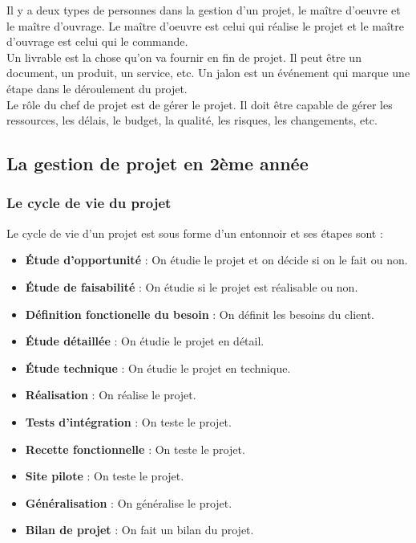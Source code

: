 \documentclass[12pt, a4paper]{article}
\begin{document}
Il y a deux types de personnes dans la gestion d'un projet, le maître d'oeuvre et
le maître d'ouvrage. Le maître d'oeuvre est celui qui réalise le projet et le maître 
d'ouvrage est celui qui le commande.\\

Un livrable est la chose qu'on va fournir en fin de projet. Il peut être un document, 
un produit, un service, etc. Un jalon est un événement qui marque une étape dans le
déroulement du projet.\\

Le rôle du chef de projet est de gérer le projet. Il doit être capable de gérer les
ressources, les délais, le budget, la qualité, les risques, les changements, etc.\\
\newpage


\subsection{La gestion de projet en 2ème année}

\subsubsection{Le cycle de vie du projet}

Le cycle de vie d'un projet est sous forme d'un entonnoir et ses étapes sont :\\
\begin{itemize}
    \item \textbf{Étude d'opportunité} : On étudie le projet et on décide si on le fait ou non.
    \item \textbf{Étude de faisabilité} : On étudie si le projet est réalisable ou non.
    \item \textbf{Définition fonctionelle du besoin} : On définit les besoins du client.
    \item \textbf{Étude détaillée} : On étudie le projet en détail.
    \item \textbf{Étude technique} : On étudie le projet en technique.
    \item \textbf{Réalisation} : On réalise le projet.
    \item \textbf{Tests d'intégration} : On teste le projet.
    \item \textbf{Recette fonctionnelle} : On teste le projet.
    \item \textbf{Site pilote} : On teste le projet.
    \item \textbf{Généralisation} : On généralise le projet.
    \item \textbf{Bilan de projet} : On fait un bilan du projet.
\end{itemize}
\end{document}

